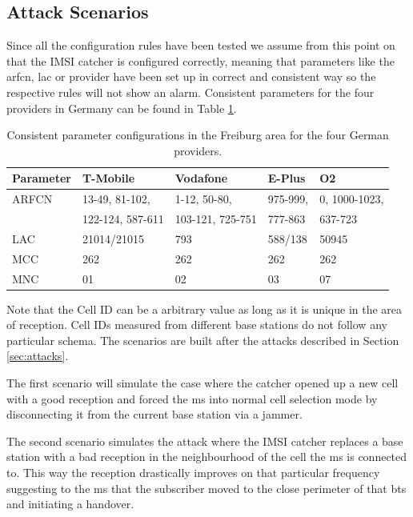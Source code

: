 \subsection{Attack Scenarios}
Since all the configuration rules have been tested we assume from this point on that the IMSI catcher is configured correctly, meaning that  parameters like the \gls{arfcn}, \gls{lac} or provider have been set up in correct and consistent way so the respective rules will not show an alarm.
Consistent parameters for the four providers in Germany can be found in Table \ref{tab:consistent_parameters}.
\begin{table}
\centering
\begin{tabular}{lllll}
\toprule
Parameter	&T-Mobile				&Vodafone			&E-Plus			&O2\\
\midrule
ARFCN		&13-49, 81-102,			&1-12, 50-80,		&975-999,		&0, 1000-1023,\\
			&122-124, 587-611		&103-121, 725-751	&777-863		&637-723\\
LAC			&21014/21015			&793				&588/138		&50945\\
MCC			&262					&262				&262			&262\\
MNC			&01						&02					&03				&07\\
\bottomrule
\end{tabular}
\caption{Consistent parameter configurations in the Freiburg area for the four German providers.}
\label{tab:consistent_parameters}
\end{table}
Note that the Cell ID can be a arbitrary value as long as it is unique in the area of reception. 
Cell IDs measured from different base stations do not follow any particular schema.
The scenarios are built after the attacks described in Section \ref{sec:attacks}.

The first scenario will simulate the case where the catcher opened up a new cell with a good reception and forced the \gls{ms} into normal cell selection mode by disconnecting it from the current base station via a jammer.

The second scenario simulates the attack where the IMSI catcher replaces a base station with a bad reception in the neighbourhood of the cell the \gls{ms} is connected to.
This way the reception drastically improves on that particular frequency suggesting to the \gls{ms} that the subscriber moved to the close perimeter of that \gls{bts} and initiating a handover.

